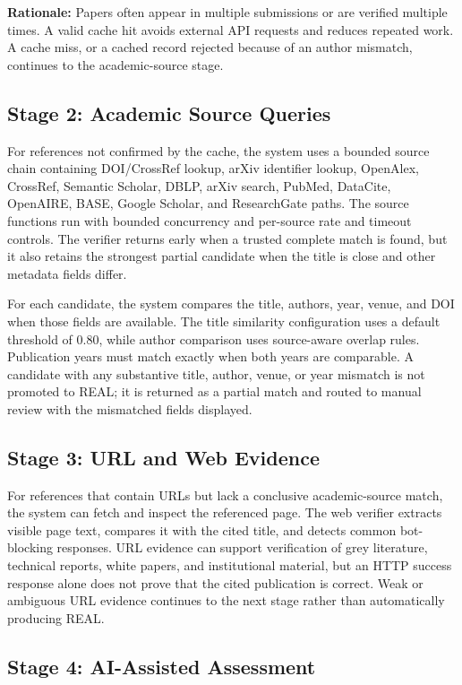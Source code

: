 \documentclass[12pt,a4paper,oneside]{report}
\begin{document}
\textbf{Rationale:} Papers often appear in multiple submissions or are verified multiple times. A valid cache hit avoids external API requests and reduces repeated work. A cache miss, or a cached record rejected because of an author mismatch, continues to the academic-source stage.

\subsection{Stage 2: Academic Source Queries}

For references not confirmed by the cache, the system uses a bounded source chain containing DOI/CrossRef lookup, arXiv identifier lookup, OpenAlex, CrossRef, Semantic Scholar, DBLP, arXiv search, PubMed, DataCite, OpenAIRE, BASE, Google Scholar, and ResearchGate paths. The source functions run with bounded concurrency and per-source rate and timeout controls. The verifier returns early when a trusted complete match is found, but it also retains the strongest partial candidate when the title is close and other metadata fields differ.

For each candidate, the system compares the title, authors, year, venue, and DOI when those fields are available. The title similarity configuration uses a default threshold of 0.80, while author comparison uses source-aware overlap rules. Publication years must match exactly when both years are comparable. A candidate with any substantive title, author, venue, or year mismatch is not promoted to REAL; it is returned as a partial match and routed to manual review with the mismatched fields displayed.

\subsection{Stage 3: URL and Web Evidence}

For references that contain URLs but lack a conclusive academic-source match, the system can fetch and inspect the referenced page. The web verifier extracts visible page text, compares it with the cited title, and detects common bot-blocking responses. URL evidence can support verification of grey literature, technical reports, white papers, and institutional material, but an HTTP success response alone does not prove that the cited publication is correct. Weak or ambiguous URL evidence continues to the next stage rather than automatically producing REAL.

\subsection{Stage 4: AI-Assisted Assessment}
\end{document}

